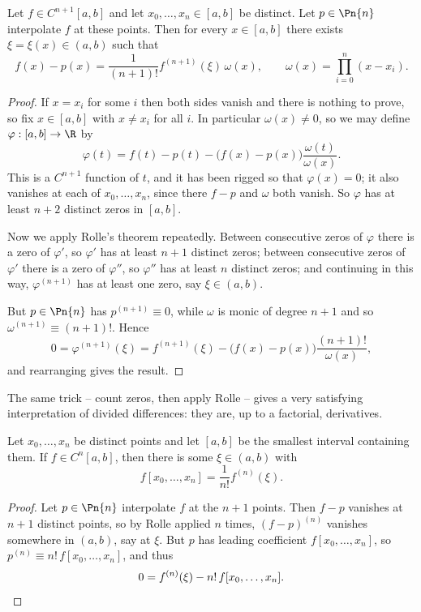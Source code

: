 \begin{theorem}\label{thm:interperror}
  Let $f \in C^{n+1}[a, b]$ and let $x_0, \dots, x_n \in [a, b]$ be distinct. Let $p \in \Pn{n}$ interpolate $f$ at these points. Then for every $x \in [a,b]$ there exists $\xi = \xi(x) \in (a,b)$ such that
  $$
  f(x) - p(x) = \frac{1}{(n+1)!}f^{(n+1)}(\xi) \, \omega(x), \qquad \omega(x) = \prod_{i=0}^{n}(x - x_i).
  $$
\end{theorem}
\begin{proof}
  If $x = x_i$ for some $i$ then both sides vanish and there is nothing to prove, so fix $x \in [a,b]$ with $x \neq x_i$ for all $i$. In particular $\omega(x) \neq 0$, so we may define $\varphi : [a,b] \to \R$ by
  $$
  \varphi(t) = f(t) - p(t) - \big(f(x) - p(x)\big)\frac{\omega(t)}{\omega(x)}.
  $$
  This is a $C^{n+1}$ function of $t$, and it has been rigged so that $\varphi(x) = 0$; it also vanishes at each of $x_0, \dots, x_n$, since there $f - p$ and $\omega$ both vanish. So $\varphi$ has at least $n+2$ distinct zeros in $[a,b]$.

  Now we apply Rolle's theorem repeatedly. Between consecutive zeros of $\varphi$ there is a zero of $\varphi'$, so $\varphi'$ has at least $n+1$ distinct zeros; between consecutive zeros of $\varphi'$ there is a zero of $\varphi''$, so $\varphi''$ has at least $n$ distinct zeros; and continuing in this way, $\varphi^{(n+1)}$ has at least one zero, say $\xi \in (a,b)$.

  But $p \in \Pn{n}$ has $p^{(n+1)} \equiv 0$, while $\omega$ is monic of degree $n+1$ and so $\omega^{(n+1)} \equiv (n+1)!$. Hence
  $$
  0 = \varphi^{(n+1)}(\xi) = f^{(n+1)}(\xi) - \big(f(x) - p(x)\big)\frac{(n+1)!}{\omega(x)},
  $$
  and rearranging gives the result.
\end{proof}

The same trick -- count zeros, then apply Rolle -- gives a very satisfying interpretation of divided differences: they are, up to a factorial, derivatives.

\begin{theorem}\label{thm:ddderiv}
  Let $x_0, \dots, x_n$ be distinct points and let $[a,b]$ be the smallest interval containing them. If $f \in C^n[a,b]$, then there is some $\xi \in (a, b)$ with
  $$
  f[x_0, \dots, x_n] = \frac{1}{n!}f^{(n)}(\xi).
  $$
\end{theorem}
\begin{proof}
  Let $p \in \Pn{n}$ interpolate $f$ at the $n+1$ points. Then $f - p$ vanishes at $n+1$ distinct points, so by Rolle applied $n$ times, $(f - p)^{(n)}$ vanishes somewhere in $(a,b)$, say at $\xi$. But $p$ has leading coefficient $f[x_0, \dots, x_n]$, so $p^{(n)} \equiv n!\, f[x_0, \dots, x_n]$, and thus
  $$
  0 = f^{(n)}(\xi) - n!\, f[x_0, \dots, x_n]. \qedhere
  $$
\end{proof}


